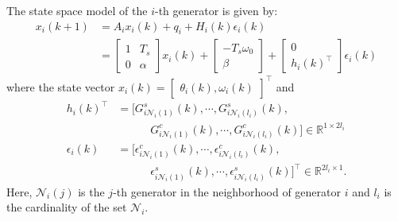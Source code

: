 The state space model of the $i$-th generator is given by:
\begin{equation}
\begin{aligned}
x_i(k+1) &= A_i x_i(k) + q_i + H_i(k) \epsilon_i(k) \\
& = \begin{bmatrix} 1 & T_s \\ 0 & \alpha \end{bmatrix} x_i(k) + \begin{bmatrix} -T_s \omega_0 \\ \beta \end{bmatrix} + \begin{bmatrix} 0 \\ h_i(k)^\top \end{bmatrix} \epsilon_i(k)
\end{aligned}
\end{equation}
where the state vector $ x_i(k) = \begin{bmatrix}  \theta_i(k), \omega_i(k) \end{bmatrix}^\top$ and
\begin{equation}
\begin{aligned}
h_i(k)^\top & = \big[ G_{i\mathcal{N}_i(1)}^s(k), \cdots, G_{i\mathcal{N}_i(l_i)}^s(k), \\
& \quad \quad \quad G_{i\mathcal{N}_i(1)}^c(k),  \cdots,  G_{i\mathcal{N}_i(l_i)}^c(k) \big] \in \mathbb{R}^{1 \times 2l_i}\\
\epsilon_i(k) & =  \big[\epsilon_{i\mathcal{N}_i(1)}^c(k), \cdots , \epsilon_{i\mathcal{N}_i(l_i)}^c(k), \\
& \quad\quad\quad \epsilon_{i\mathcal{N}_i(1)}^s (k), \cdots, \epsilon_{i\mathcal{N}_i(l_i)}^s (k) \big] ^\top \in \mathbb{R}^{2l_i \times 1}.
\end{aligned}\nonumber
\end{equation}
Here, $\mathcal{N}_i(j)$ is the $j$-th generator in the neighborhood of generator $i$ and $l_i$ is the cardinality of the set $\mathcal{N}_i$.

